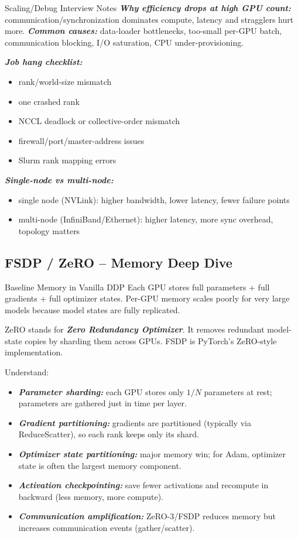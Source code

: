 \documentclass[12pt]{article}
\let\origtextbf\textbf
\renewcommand{\textbf}[1]{\origtextbf{\textit{#1}}}
\begin{document}
\begin{redbox}{Scaling/Debug Interview Notes}
\textbf{Why efficiency drops at high GPU count:} communication/synchronization dominates compute, latency and stragglers hurt more.  
\textbf{Common causes:} data-loader bottlenecks, too-small per-GPU batch, communication blocking, I/O saturation, CPU under-provisioning.

\textbf{Job hang checklist:}
\begin{itemize}
\item rank/world-size mismatch
\item one crashed rank
\item NCCL deadlock or collective-order mismatch
\item firewall/port/master-address issues
\item Slurm rank mapping errors
\end{itemize}

\textbf{Single-node vs multi-node:}
\begin{itemize}
\item single node (NVLink): higher bandwidth, lower latency, fewer failure points
\item multi-node (InfiniBand/Ethernet): higher latency, more sync overhead, topology matters
\end{itemize}
\end{redbox}

\vspace{1cm}

\subsection{FSDP / ZeRO -- Memory Deep Dive}

\begin{bluebox}{Baseline Memory in Vanilla DDP}
Each GPU stores full parameters + full gradients + full optimizer states.  
Per-GPU memory scales poorly for very large models because model states are fully replicated.
\end{bluebox}

ZeRO stands for \textbf{Zero Redundancy Optimizer}. It removes redundant model-state copies by sharding them across GPUs. FSDP is PyTorch's ZeRO-style implementation.

Understand:
\begin{itemize}
\item \textbf{Parameter sharding:} each GPU stores only \(1/N\) parameters at rest; parameters are gathered just in time per layer.
\item \textbf{Gradient partitioning:} gradients are partitioned (typically via ReduceScatter), so each rank keeps only its shard.
\item \textbf{Optimizer state partitioning:} major memory win; for Adam, optimizer state is often the largest memory component.
\item \textbf{Activation checkpointing:} save fewer activations and recompute in backward (less memory, more compute).
\item \textbf{Communication amplification:} ZeRO-3/FSDP reduces memory but increases communication events (gather/scatter).
\end{itemize}
\end{document}
